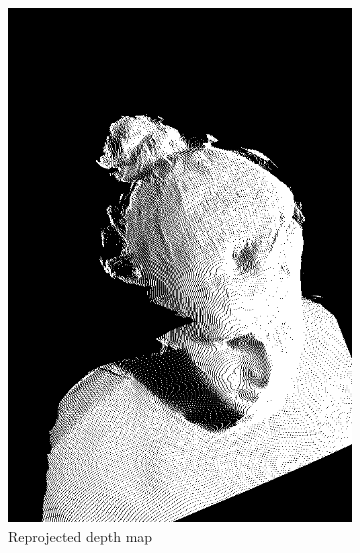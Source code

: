 \begin{figure}[H]
\begin{subfigure}{0.3\linewidth}
		\includegraphics[width=\textwidth]{Figures/failed/depth_reprojection/depth_intersection_0to7.png}
		\caption{Reprojected depth map}
	\end{subfigure}
	\begin{subfigure}{0.3\linewidth}

\end{subfigure}
\end{figure}
